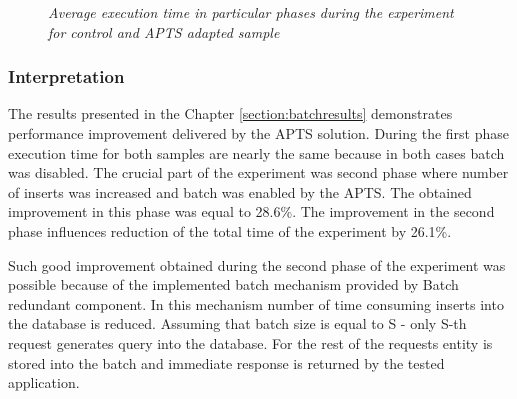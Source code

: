 \documentclass[10pt,a4paper]{article}
\begin{document}
\mydata
\begin{figure}[!htb]
\centering
{}
\caption{\textit{Average execution time in particular phases during the experiment for control and APTS adapted sample}} \label{batchEvalResutlsGraph}
\end{figure}

\subsubsection{Interpretation} 

The results presented in the Chapter \ref{section:batchresults} demonstrates performance improvement delivered by the APTS solution. During the first phase execution time for both samples are nearly the same because in both cases batch was disabled. The crucial part of the experiment was second phase where number of inserts was increased and batch was enabled by the APTS. The obtained improvement in this phase was equal to 28.6\%. The improvement in the second phase influences reduction of the total time of the experiment by 26.1\%. 

Such good improvement obtained during the second phase of the experiment was possible because of the implemented batch mechanism provided by Batch redundant component. In this mechanism number of time consuming inserts into the database is reduced. Assuming that batch size is equal to S - only S-th request generates query into the database. For the rest of the requests entity is stored into the batch and immediate response is returned by the tested application. 
\end{document}
